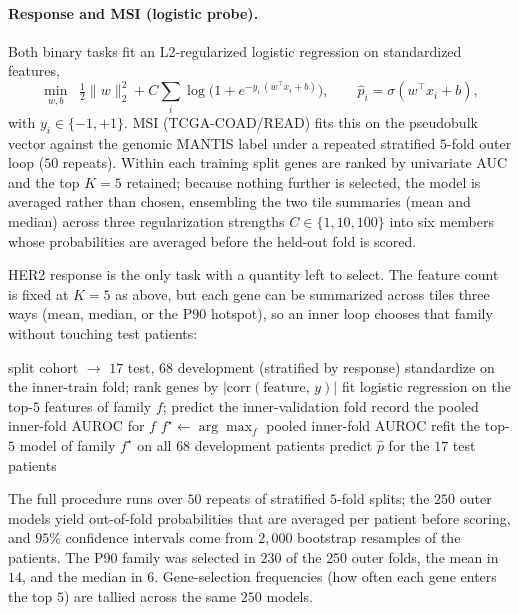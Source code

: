 \documentclass[11pt]{article}
\begin{document}
\paragraph{Response and MSI (logistic probe).} Both binary tasks fit an
L2-regularized logistic regression on standardized features,
\[
\min_{w,b}\;\;\tfrac{1}{2}\lVert w\rVert_2^2
+C\sum_{i}\log\!\Big(1+e^{-y_i\,(w^{\top}x_i+b)}\Big),
\qquad
\hat p_i=\sigma(w^{\top}x_i+b),
\]
with $y_i\in\{-1,+1\}$. MSI (TCGA-COAD/READ) fits this on the pseudobulk vector
against the genomic MANTIS label under a repeated stratified $5$-fold outer loop
($50$ repeats). Within each training split genes are ranked by univariate AUC
and the top $K=5$ retained; because nothing further is selected, the model is
averaged rather than chosen, ensembling the two tile summaries (mean and median)
across three regularization strengths $C\in\{1,10,100\}$ into six members whose
probabilities are averaged before the held-out fold is scored.

HER2 response is the only task with a quantity left to select. The feature count
is fixed at $K=5$ as above, but each gene can be summarized across tiles three
ways (mean, median, or the P90 hotspot), so an inner loop chooses that family
without touching test patients:
\begin{algorithm}[!htbp]
\caption{HER2 response: nested inner-CV summary-family selection (one outer fold)}
\begin{algorithmic}[1]
\State split cohort $\to$ $17$ test, $68$ development (stratified by response)
    \State standardize on the inner-train fold; rank genes by $|\mathrm{corr}(\text{feature},\,y)|$
    \State fit logistic regression on the top-$5$ features of family $f$; predict the inner-validation fold
  \EndFor
  \State record the pooled inner-fold AUROC for $f$
\EndFor
\State $f^\star\gets\arg\max_f$ pooled inner-fold AUROC
\State refit the top-$5$ model of family $f^\star$ on all $68$ development patients
\State predict $\hat p$ for the $17$ test patients
\end{algorithmic}
\end{algorithm}
The full procedure runs over $50$ repeats of stratified $5$-fold splits; the
$250$ outer models yield out-of-fold probabilities that are averaged per patient
before scoring, and $95\%$ confidence intervals come from $2{,}000$ bootstrap
resamples of the patients. The P90 family was selected in $230$ of the $250$
outer folds, the mean in $14$, and the median in $6$. Gene-selection frequencies
(how often each gene enters the top $5$) are tallied across the same $250$ models.



\end{document}
